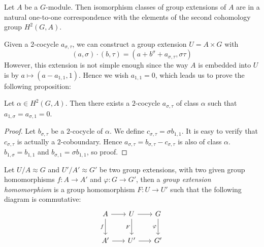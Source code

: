 \begin{theorem}
    Let $A$ be a $G$-module. Then isomorphism classes of group extensions of $A$ are in a natural one-to-one correspondence with the elements of the second cohomology group $H^2(G,A)$.
\end{theorem}

\begin{remark}
    Given a $2$-cocycle $a_{\sigma,\tau}$, we can construct a group extension $U=A\times G$ with $$ (a,\sigma)\cdot(b,\tau)=(a+b^\sigma+a_{\sigma,\tau},\sigma\tau) $$ However, this extension is not simple enough since the way $A$ is embedded into $U$ is by $a\mapsto(a-a_{1,1},1)$. Hence we wish $a_{1,1}=0$, which leads us to prove the following proposition:
\end{remark}

\begin{proposition} \label{thm:2-cocycle to be simple}
    Let $\alpha\in H^2(G,A)$. Then there exists a $2$-cocycle $a_{\sigma,\tau}$ of class $\alpha$ such that $a_{1,\sigma}=a_{\sigma,1}=0$.
\end{proposition}

\begin{proof}
    Let $b_{\sigma,\tau}$ be a $2$-cocycle of $\alpha$. We define $c_{\sigma,\tau}=\sigma b_{1,1}$. It is easy to verify that $c_{\sigma,\tau}$ is actually a $2$-coboundary. Hence $a_{\sigma,\tau}=b_{\sigma,\tau}-c_{\sigma,\tau}$ is also of class $\alpha$. $b_{1,\sigma}=b_{1,1}$ and $b_{\sigma,1}=\sigma b_{1,1}$, so proof.
\end{proof}



\begin{definition}
    Let $U/A\approx G$ and $U'/A'\approx G'$ be two group extensions, with two given group homomorphisms $f:A\to A'$ and $\varphi:G\to G'$, then a \emph{group extension homomorphism} is a group homomorphism $F:U\to U'$ such that the following diagram is commutative:
    \[\begin{tikzcd}[column sep=scriptsize,row sep=2.25em]
        A & U & G \\
        {A'} & {U'} & {G'}
        \arrow["f"', from=1-1, to=2-1]
        \arrow[from=1-1, to=1-2]
        \arrow[from=1-2, to=1-3]
        \arrow["F"', from=1-2, to=2-2]
        \arrow[from=2-1, to=2-2]
        \arrow["\varphi"', from=1-3, to=2-3]
        \arrow[from=2-2, to=2-3]
    \end{tikzcd}\]
\end{definition}

